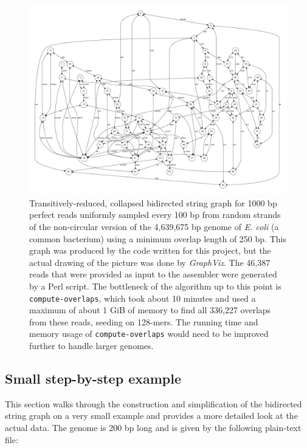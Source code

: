 \documentclass[12pt]{article}
\newcommand{\ProgramName}[1]{{\tt #1}}
\begin{document}
\begin{figure}
	\begin{center}
		\includegraphics[width=1.0\textwidth]{E_coli.pdf}
		\caption{Transitively-reduced, collapsed bidirected string graph for
		1000 bp perfect reads uniformly sampled every 100 bp from random strands
		of the non-circular version of the 4,639,675 bp genome of {\it E. coli}
		(a common bacterium) using a minimum overlap length of 250 bp.  This
		graph was produced by the code written for this project, but the actual
		drawing of the picture was done by {\it
		GraphViz}\cite{GraphVizPublication}.  The 46,387 reads
		that were provided as input to the assembler were generated by a Perl
		script.  The bottleneck of the algorithm up to this point is
		\ProgramName{compute-overlaps}, which took about 10 minutes and used a
		maximum of about 1 GiB of memory to find all 336,227 overlaps from these
		reads, seeding on 128-mers.  The running time and memory usage of
		\ProgramName{compute-overlaps} would need to be improved further to handle
		larger genomes.}
		\label{fig:E_coli}
	\end{center}
\end{figure}

\subsection{Small step-by-step example}

This section walks through the construction and simplification of the bidirected
string graph on a very small example and provides a more detailed look at the
actual data.  The genome is 200 bp long and is given by the following plain-text
file:
\end{document}
